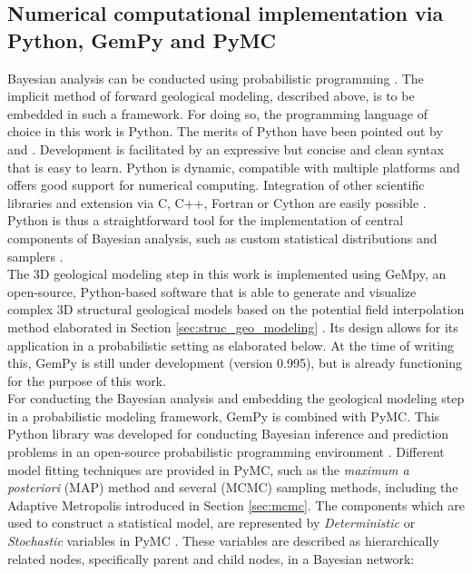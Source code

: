 		\subsection{Numerical computational implementation via Python, GemPy and PyMC}\label{sec:numerical_implementation}
		Bayesian analysis can be conducted using probabilistic programming \citep{salvatier2016pymc3}. The implicit method of forward geological modeling, described above, is to be embedded in such a framework. For doing so, the programming language of choice in this work is Python. The merits of Python have been pointed out by \citet{behnel2010, Langtangen2008} and \citet{salvatier2016pymc3}. Development is facilitated by an expressive but concise and clean syntax that is easy to learn. Python is dynamic, compatible with multiple platforms and offers good support for numerical computing. Integration of other scientific libraries and extension via C, C++, Fortran or Cython are easily possible \citep{behnel2010, salvatier2016pymc3, Langtangen2008}. Python is thus a straightforward tool for the implementation of central components of Bayesian analysis, such as custom statistical distributions and samplers \citep{salvatier2016pymc3}.\\
		The 3D geological modeling step in this work is implemented using GeMpy, an open-source, Python-based software that is able to generate and visualize complex 3D structural geological models based on the potential field interpolation method elaborated in Section \ref{sec:struc_geo_modeling} \citep{delaVarga2017gempy}. Its design allows for its application in a probabilistic setting as elaborated below. At the time of writing this, GemPy is still under development (version 0.995), but is already functioning for the purpose of this work.\\
		For conducting the Bayesian analysis and embedding the geological modeling step in a probabilistic modeling framework, GemPy is combined with PyMC. This Python library was developed for conducting Bayesian inference and prediction problems in an open-source probabilistic programming environment \citep{davidson2015, salvatier2016pymc3}. Different model fitting techniques are provided in PyMC, such as the \textit{maximum a posteriori} (MAP) method and several (MCMC) sampling methods, including the Adaptive Metropolis introduced in Section \ref{sec:mcmc}. The components which are used to construct a statistical model, are represented by \textit{Deterministic} or \textit{Stochastic} variables in PyMC \citep{salvatier2016pymc3}. These variables are described as hierarchically related nodes, specifically parent and child nodes, in a Bayesian network:
